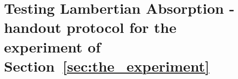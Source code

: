 \chapter{Testing Lambertian Absorption - handout protocol for the
experiment of Section~\ref{sec:the_experiment}}
\label{ap:protocol}


